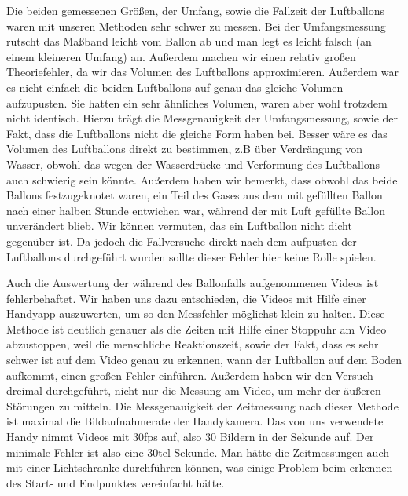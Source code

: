 \documentclass{article}
\begin{document}
          Die beiden gemessenen Größen, der Umfang, sowie die Fallzeit der Luftballons waren mit unseren Methoden sehr schwer zu messen.
          Bei der Umfangsmessung rutscht das Maßband leicht vom Ballon ab und man legt es leicht falsch (an einem kleineren Umfang) an.
          Außerdem machen wir einen relativ großen Theoriefehler, da wir das Volumen des Luftballons approximieren.
          Außerdem war es nicht einfach die beiden Luftballons auf genau das gleiche Volumen aufzupusten.
          Sie hatten ein sehr ähnliches Volumen, waren aber wohl trotzdem nicht identisch.
          Hierzu trägt die Messgenauigkeit der Umfangsmessung, sowie der Fakt, dass die Luftballons nicht die gleiche Form haben bei.
          Besser wäre es das Volumen des Luftballons direkt zu bestimmen, z.B über Verdrängung von Wasser,
          obwohl das wegen der Wasserdrücke und Verformung des Luftballons auch schwierig sein könnte.
          Außerdem haben wir bemerkt, dass obwohl das beide Ballons festzugeknotet waren, ein Teil des Gases aus dem mit  gefüllten Ballon nach
          einer halben Stunde entwichen war, während der mit Luft gefüllte Ballon unverändert blieb.
          Wir können vermuten, das ein Luftballon nicht dicht gegenüber  ist.
          Da jedoch die Fallversuche direkt nach dem aufpusten der Luftballons durchgeführt wurden sollte dieser Fehler hier keine Rolle spielen.

          Auch die Auswertung der während des Ballonfalls aufgenommenen Videos ist fehlerbehaftet.
          Wir haben uns dazu entschieden, die Videos mit Hilfe einer Handyapp auszuwerten, um so den Messfehler möglichst klein zu halten.
          Diese Methode ist deutlich genauer als die Zeiten mit Hilfe einer Stoppuhr am Video abzustoppen, weil die menschliche Reaktionszeit,
          sowie der Fakt, dass es sehr schwer ist auf dem Video genau zu erkennen, wann der Luftballon auf dem Boden aufkommt, einen großen Fehler einführen.
          Außerdem haben wir den Versuch dreimal durchgeführt, nicht nur die Messung am Video, um mehr der äußeren Störungen zu mitteln.
          Die Messgenauigkeit der Zeitmessung nach dieser Methode ist maximal die Bildaufnahmerate der Handykamera.
          Das von uns verwendete Handy nimmt Videos mit 30fps auf, also 30 Bildern in der Sekunde auf.
          Der minimale Fehler ist also eine 30tel Sekunde.
          Man hätte die Zeitmessungen auch mit einer Lichtschranke durchführen können, was einige Problem beim erkennen des Start- und Endpunktes vereinfacht hätte.
\end{document}

